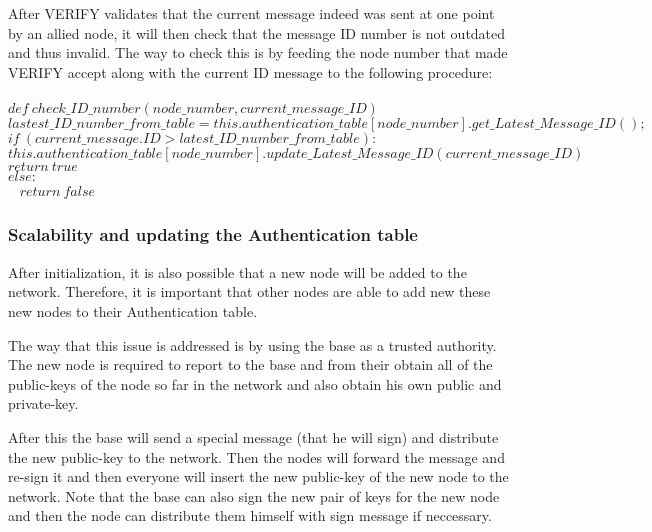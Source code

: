 \documentclass[letterpaper]{article}
\begin{document}
After \textsc{VERIFY} validates that the current message indeed was sent at one point by an allied node, it will then check that the message ID number is not outdated and thus invalid. The way to check this is by feeding the node number that made VERIFY accept along with the current ID message to the following procedure:\\ \\
$def \ check\_ID\_number(node\_number, current\_message\_ID)$ \\
\hspace*{10 mm} $lastest\_ID\_number\_from\_table = this.authentication\_table[node\_number].get\_Latest\_Message\_ID();$
\hspace*{10 mm} $if \ (current\_message.ID > latest\_ID\_number\_from\_table):$\\
\hspace*{20 mm} $this.authentication\_table[node\_number].update\_Latest\_Message\_ID(current\_message\_ID)$\\
\hspace*{20 mm} $return \ true$ \\
\hspace*{10 mm} $else:$\\ \ 
\hspace*{20 mm} $return \ false$\\


\subsubsection{Scalability and updating the Authentication table}

After initialization, it is also possible that a new node will be added to the network. 
Therefore, it is important that other nodes are able to add new these new nodes to their Authentication table.

The way that this issue is addressed is by using the base as a trusted authority.
The new node is required to report to the base and from their obtain all of the public-keys of the node so far in the network and also obtain his own public and private-key. 

After this the base will send a special message (that he will sign) and distribute the new public-key to the network. 
Then the nodes will forward the message and re-sign it and then everyone will insert the new public-key of the new node to the network. Note that the base can also sign the new pair of keys for the new node and then the node can distribute them himself with sign message if neccessary.
\end{document}
